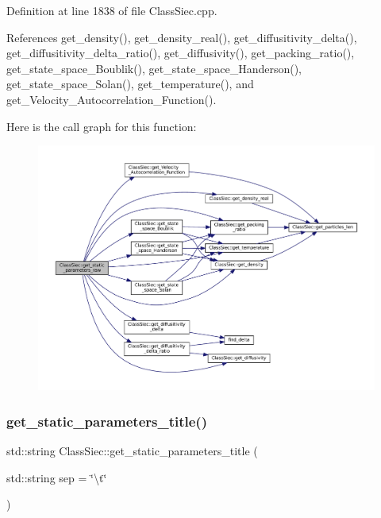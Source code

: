 Definition at line 1838 of file Class\+Siec.\+cpp.



References get\+\_\+density(), get\+\_\+density\+\_\+real(), get\+\_\+diffusitivity\+\_\+delta(), get\+\_\+diffusitivity\+\_\+delta\+\_\+ratio(), get\+\_\+diffusivity(), get\+\_\+packing\+\_\+ratio(), get\+\_\+state\+\_\+space\+\_\+\+Boublik(), get\+\_\+state\+\_\+space\+\_\+\+Handerson(), get\+\_\+state\+\_\+space\+\_\+\+Solan(), get\+\_\+temperature(), and get\+\_\+\+Velocity\+\_\+\+Autocorrelation\+\_\+\+Function().

Here is the call graph for this function\+:
\nopagebreak
\begin{figure}[H]
\begin{center}
\leavevmode
\includegraphics[width=350pt]{classClassSiec_abed8d28e81524a99ab325569db15bb36_cgraph}
\end{center}
\end{figure}
\mbox{\label{classClassSiec_a1fcb70fc39cb91fe5b5382c7911de316}} 
\subsubsection{\texorpdfstring{get\+\_\+static\+\_\+parameters\+\_\+title()}{get\_static\_parameters\_title()}}
{\footnotesize\ttfamily std\+::string Class\+Siec\+::get\+\_\+static\+\_\+parameters\+\_\+title (\begin{DoxyParamCaption}\item[{std\+::string}]{sep = {\ttfamily \char`\"{}\textbackslash{}t\char`\"{}} }\end{DoxyParamCaption})}

